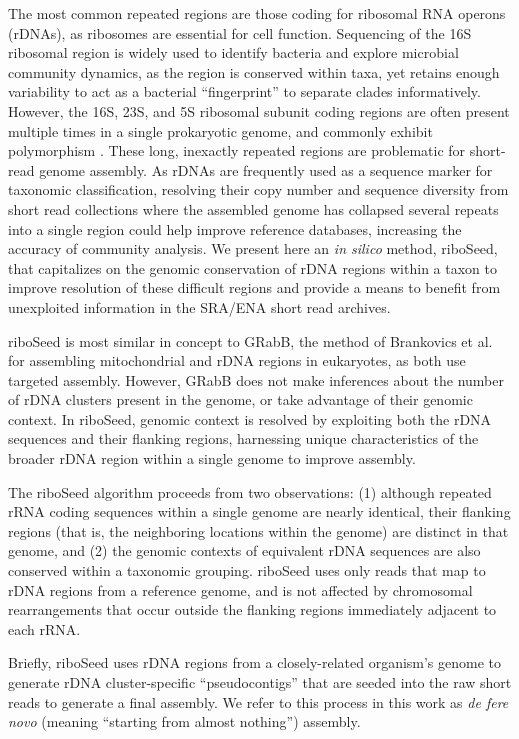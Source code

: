 \documentclass[10pt]{article}
\begin{document}
\begin{linenumbers}
The most common repeated regions are those coding for ribosomal RNA operons (rDNAs), as ribosomes are essential for cell function. Sequencing of the 16S ribosomal region is widely used to identify bacteria and explore microbial community dynamics\cite{Weisburg1991,Clarridge2004,Woese1990,Case2007}, as the region is conserved within taxa, yet retains enough variability to act as a bacterial ``fingerprint'' to separate clades informatively. However, the 16S, 23S, and 5S ribosomal subunit coding regions are often present multiple times in a single prokaryotic genome, and commonly exhibit polymorphism \cite{Coenye2003,Moreno2002,Lukjancenko2010,Vetrovsky2013}. These long, inexactly repeated regions\cite{Alkan2011} are problematic for short-read genome assembly. As rDNAs are frequently used as a sequence marker for taxonomic classification, resolving their copy number and sequence diversity from short read collections where the assembled genome has collapsed several repeats into a single region could help improve reference databases, increasing the accuracy of community analysis. We present here an \textit{in silico} method, riboSeed, that capitalizes on the genomic conservation of rDNA regions within a taxon to improve resolution of these difficult regions and provide a means to benefit from unexploited information in the SRA/ENA short read archives.


riboSeed is most similar in concept to GRabB, the method of Brankovics et al. \cite{Brankovics2016} for assembling mitochondrial and rDNA regions in eukaryotes, as both use targeted assembly. However, GRabB does not make inferences about the number of rDNA clusters present in the genome, or take advantage of their genomic context. In riboSeed, genomic context is resolved by exploiting both the rDNA sequences and their flanking regions, harnessing unique characteristics of the broader rDNA region within a single genome to improve assembly.


The riboSeed algorithm proceeds from two observations: (1) although repeated rRNA coding sequences within a single genome are nearly identical, their flanking regions (that is, the neighboring locations within the genome) are distinct in that genome, and (2) the genomic contexts of equivalent rDNA sequences are also conserved within a taxonomic grouping. riboSeed uses only reads that map to rDNA regions from a reference genome, and is not affected by chromosomal rearrangements that occur outside the flanking regions immediately adjacent to each rRNA.


Briefly, riboSeed uses rDNA regions from a closely-related organism's genome to generate rDNA cluster-specific ``pseudocontigs'' that are seeded into the raw short reads to generate a final assembly. We refer to this process in this work as \textit{de fere novo} (meaning ``starting from almost nothing'') assembly.



\end{linenumbers}
\end{document}
